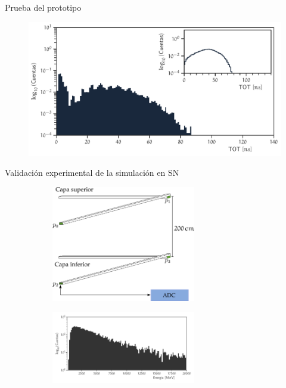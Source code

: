 \documentclass[spanish,aspectratio=169]{beamer}
\begin{document}
\begin{frame}{Prueba del prototipo}

\begin{figure}
        \centering
        \includegraphics[width=\textwidth]{tdc_sim-exp.pdf}
\end{figure}

\end{frame}


\begin{frame}{Validación experimental de la simulación en SN}

\begin{figure}
          \centering
          \begin{subfigure}[b]{0.45\textwidth}
                  \includegraphics[width=6.3cm]{muons-experiment-0.pdf}
          \end{subfigure}
          \begin{subfigure}[b]{0.45\textwidth}
                  \includegraphics[width=6.3cm]{scibar-edep.pdf}
          \end{subfigure}
\end{figure}

\end{frame}
\end{document}
